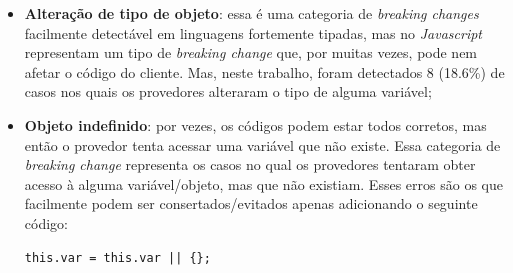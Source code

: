 \begin{itemize}

    \item \textbf{Alteração de tipo de objeto}: essa é uma categoria de \textit{breaking changes} facilmente detectável em linguagens fortemente tipadas, mas no \textit{Javascript} representam um tipo de \textit{breaking change} que, por muitas vezes, pode nem afetar o código do cliente. Mas, neste trabalho, foram detectados 8 (18.6\%) de casos nos quais os provedores alteraram o tipo de alguma variável;



    \item \textbf{Objeto indefinido}: por vezes, os códigos podem estar todos corretos, mas então o provedor tenta acessar uma variável que não existe. Essa categoria de \textit{breaking change} representa os casos no qual os provedores tentaram obter acesso à alguma variável/objeto, mas que não existiam. Esses erros são os que facilmente podem ser consertados/evitados apenas adicionando o seguinte código:

    \begin{lstlisting}[style=bash, label=cod:undefined_object]
    this.var = this.var || {};
    \end{lstlisting}


\end{itemize}
